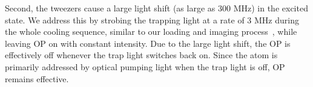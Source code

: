 \documentclass[aps,prl,twocolumn,groupedaddress]{revtex4-1}
\begin{document}
Second, the tweezers cause a large light shift (as large as $300$ MHz)
in the excited state. %
We address this by strobing the trapping light at a rate of 3 MHz during the whole cooling sequence,
similar to our loading and imaging process~\cite{Hutzler2017-LightShifts},
while leaving OP on with constant intensity.
Due to the large light shift, the OP is effectively off whenever the trap light switches back on.
Since the atom is primarily addressed by  optical pumping light when the trap light is off, OP remains effective.
\end{document}
